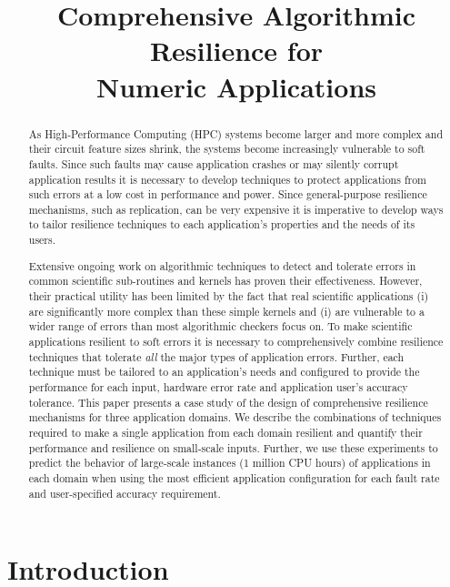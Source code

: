 \documentclass[10pt, conference, compsocconf]{IEEEtran}
\title{Comprehensive Algorithmic Resilience for \\Numeric Applications}
\author{\IEEEauthorblockN{Sui Chen}
\IEEEauthorblockA{Louisiana State \\ University}
\and
\IEEEauthorblockN{Greg Bronevetsky}
\IEEEauthorblockA{Lawrence Livermore \\ National Laboratory}
\and
\IEEEauthorblockN{Marc Casas-Guix}
\IEEEauthorblockA{Barcelona Supercomputing \\ Center}
\and
\IEEEauthorblockN{Lu Peng}
\IEEEauthorblockA{Louisiana State \\ University}
}
\begin{document}
\maketitle
\begin{abstract}

As High-Performance Computing (HPC) systems become larger and more complex and their circuit feature sizes shrink, the systems become increasingly vulnerable to soft faults.
Since such faults may cause application crashes or may silently corrupt application results it is necessary to develop techniques to protect applications from such errors at a low cost in performance and power.
Since general-purpose resilience mechanisms, such as replication, can be very expensive it is imperative to develop ways to tailor resilience techniques to each application's properties and the needs of its users.

Extensive ongoing work on algorithmic techniques to detect and tolerate errors in common scientific sub-routines and kernels has proven their effectiveness.
However, their practical utility has been limited by the fact that real scientific applications (i) are significantly more complex than these simple kernels and (i) are vulnerable to a wider range of errors than most algorithmic checkers focus on.
To make scientific applications resilient to soft errors it is necessary to comprehensively combine resilience techniques that tolerate \emph{all} the major types of application errors.
Further, each technique must be tailored to an application's needs and configured to provide the performance for each input, hardware error rate and application user's accuracy tolerance.
This paper presents a case study of the design of comprehensive resilience mechanisms for three application domains.
We describe the combinations of techniques required to make a single application from each domain resilient and quantify their performance and resilience on small-scale inputs.
Further, we use these experiments to predict the behavior of large-scale instances (1 million CPU hours) of applications in each domain when using the most efficient application configuration for each fault rate and user-specified accuracy requirement.

\end{abstract}

\section{Introduction}
\label{sec:intro}
\end{document}
